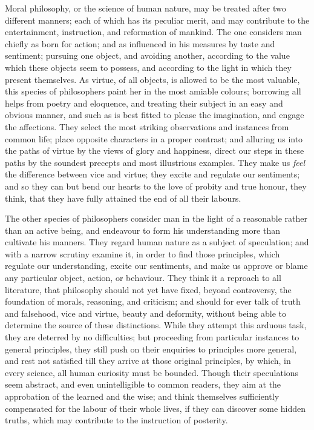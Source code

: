 \documentclass[]{article}
\begin{document}
\begin{sectionbody}

\humeparagraph  Moral philosophy, or the science of human nature, may be treated after two different manners; each of which has its peculiar merit, and may contribute to the entertainment, instruction, and reformation of mankind. The one considers man chiefly as born for action; and as influenced in his measures by taste and sentiment; pursuing one object, and avoiding another, according to the value which these objects seem to possess, and according to the light in which they present themselves. As virtue, of all objects, is allowed to be the most valuable, this species of philosophers paint her in the most amiable colours; borrowing all helps from poetry and eloquence, and treating their subject in an easy and obvious manner, and such as is best fitted to please the imagination, and engage the affections. They select the most striking observations and instances from common life; place opposite characters in a proper contrast; and alluring us into the paths of virtue by the views of glory and happiness, direct our steps in these paths by the soundest precepts and most illustrious examples. They make us \emph{feel} the difference between vice and virtue; they excite and regulate our sentiments; and so they can but bend our hearts to the love of probity and true honour, they think, that they have fully attained the end of all their labours.

\humeparagraph  The other species of philosophers consider man in the light of a reasonable rather than an active being, and endeavour to form his understanding more than cultivate his manners. They regard human nature as a subject of speculation; and with a narrow scrutiny examine it, in order to find those principles, which regulate our understanding, excite our sentiments, and make us approve or blame any particular object, action, or behaviour. They think it a reproach to all literature, that philosophy should not yet have fixed, beyond controversy, the foundation of morals, reasoning, and criticism; and should for ever talk of truth and falsehood, vice and virtue, beauty and deformity, without being able to determine the source of these distinctions. While they attempt this arduous task, they are deterred by no difficulties; but proceeding from particular instances to general principles, they still push on their enquiries to principles more general, and rest not satisfied till they arrive at those original principles, by which, in every science, all human curiosity must be bounded. Though their speculations seem abstract, and even unintelligible to common readers, they aim at the approbation of the learned and the wise; and think themselves sufficiently compensated for the labour of their whole lives, if they can discover some hidden truths, which may contribute to the instruction of posterity.


\end{sectionbody}
\end{document}
